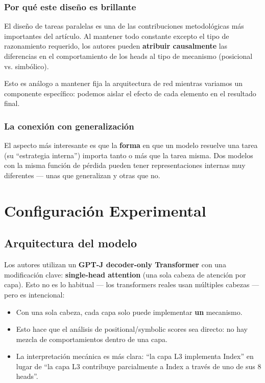 \documentclass[12pt,a4paper,oneside]{report}
\begin{document}
\subsection{Por qué este diseño es brillante}

El diseño de tareas paralelas es una de las contribuciones metodológicas más importantes del artículo. Al mantener todo constante excepto el tipo de razonamiento requerido, los autores pueden \textbf{atribuir causalmente} las diferencias en el comportamiento de los heads al tipo de mecanismo (posicional vs. simbólico).

Esto es análogo a mantener fija la arquitectura de red mientras variamos un componente específico: podemos aislar el efecto de cada elemento en el resultado final.

\subsection{La conexión con generalización}

El aspecto más interesante es que la \textbf{forma} en que un modelo resuelve una tarea (su ``estrategia interna'') importa tanto o más que la tarea misma. Dos modelos con la misma función de pérdida pueden tener representaciones internas muy diferentes — unas que generalizan y otras que no.

\newpage

\chapter{Configuración Experimental}

\section{Arquitectura del modelo}

Los autores utilizan un \textbf{GPT-J decoder-only Transformer} con una modificación clave: \textbf{single-head attention} (una sola cabeza de atención por capa). Esto no es lo habitual — los transformers reales usan múltiples cabezas — pero es intencional:

\begin{itemize}
    \item Con una sola cabeza, cada capa solo puede implementar \textbf{un} mecanismo.
    \item Esto hace que el análisis de positional/symbolic scores sea directo: no hay mezcla de comportamientos dentro de una capa.
    \item La interpretación mecánica es más clara: ``la capa L3 implementa Index'' en lugar de ``la capa L3 contribuye parcialmente a Index a través de uno de sus 8 heads''.
\end{itemize}
\end{document}

